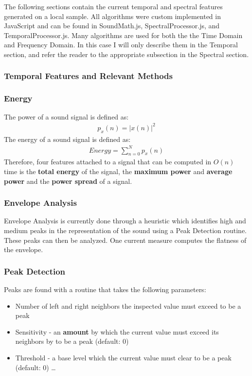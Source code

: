 \documentclass[DIV=calc, paper=a4, fontsize=11pt, twocolumn]{scrartcl}   %
\begin{document}
\par The following sections contain the current temporal and spectral features generated on a local sample. All algorithms were custom implemented in JavaScript and can be found in SoundMath.js, SpectralProcessor.js, and TemporalProcessor.js. Many algorithms are used for both the the Time Domain and Frequency Domain. In this case I will only describe them in the Temporal section, and refer the reader to the appropriate subsection in the Spectral section.


\subsubsection{Temporal Features and Relevant Methods}
\subsubsection {Energy}
   The power of a sound signal is defined as:
   \begin{align}
      p_x(n) = |x(n)|^2
   \end{align}
   The energy of a sound signal is defined as:
   \begin{align}
     Energy = \sum_{n=0}^N p_x(n)
   \end{align}
   Therefore, four features attached to a signal that can be computed in $O(n)$ time is the \textbf{total energy} of the signal, the \textbf{maximum power} and \textbf{average power} and the \textbf{power spread} of a signal.

   \subsubsection {Envelope Analysis}
   Envelope Analysis is currently done through a heuristic which identifies high and medium peaks in the representation of the sound using a Peak Detection routine. These peaks can then be analyzed. One current measure computes the flatness of the envelope.
    \subsubsection {Peak Detection}
    Peaks are found with a routine that takes the following parameters:
      \begin{itemize}
        \item Number of left and right neighbors the inspected value must exceed to be a peak
        \item Sensitivity - an \textbf{amount} by which the current value must exceed its neighbors by to be a peak (default: 0)
        \item Threshold - a base level which the current value must clear to be a peak (default: 0) \ldots
      \end{itemize}
\end{document}
